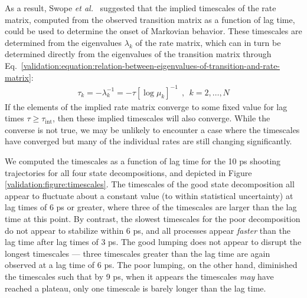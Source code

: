 As a result, Swope \emph{et al.}\ \cite{swope:2004a} suggested that the implied timescales of the rate matrix, computed from the observed transition matrix as a function of lag time, could be used to determine the onset of Markovian behavior.
These timescales are determined from the eigenvalues $\lambda_k$ of the rate matrix, which can in turn be determined directly from the eigenvalues of the transition matrix through Eq.\ \ref{validation:equation:relation-between-eigenvalues-of-transition-and-rate-matrix}:
\begin{eqnarray}
\tau_k = - \lambda_k^{-1} = - \tau [\log \mu_k]^{-1} \:\:,\:\: k = 2,\ldots,N
\end{eqnarray}
If the elements of the implied rate matrix converge to some fixed value for lag times $\tau \ge \tau_\mathrm{int}$, then these implied timescales will also converge.
While the converse is not true, we may be unlikely to encounter a case where the timescales have converged but many of the individual rates are still changing significantly.

We computed the timescales as a function of lag time for the 10 ps shooting trajectories for all four state decompositions, and depicted in Figure \ref{validation:figure:timescales}.
The timescales of the good state decomposition all appear to fluctuate about a constant value (to within statistical uncertainty) at lag times of 6 ps or greater, where three of the timescales are larger than the lag time at this point.
By contrast, the slowest timescales for the poor decomposition do not appear to stabilize within 6 ps, and all processes appear \emph{faster} than the lag time after lag times of 3 ps.
The good lumping does not appear to disrupt the longest timescales --- three timescales greater than the lag time are again observed at a lag time of 6 ps.
The poor lumping,  on the other hand, diminished the timescales such that by 9 ps, when it appears the timescales \emph{may} have reached a plateau, only one timescale is barely longer than the lag time.



